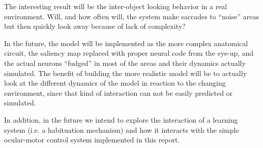 \documentclass[conference]{IEEEtran}
\begin{document}
The interesting result will be the inter-object looking behavior in a
real environment. Will, and how often will, the system make saccades
to ``noise'' areas but then quickly look away because of lack of
complexity?

In the future, the model will be implemented as the more complex
anatomical circuit, the saliency map replaced with proper neural code
from the eye-up, and the actual neurons ``fudged'' in most of the
areas and their dynamics actually simulated. The benefit of building
the more realistic model will be to actually look at the different
dynamics of the model in reaction to the changing environment, since
that kind of interaction can not be easily predicted or simulated.

In addition, in the future we intend to explore the interaction of a
learning system (i.e. a habituation mechanism) and how it interacts
with the simple ocular-motor control system implemented in this
report.


% 


\end{document}
